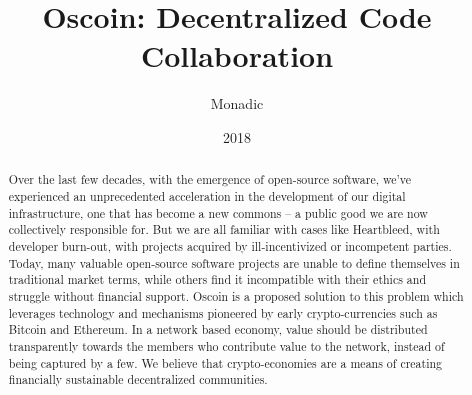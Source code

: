 \documentclass[a4paper, 9pt, draft]{amsart}
\title[Oscoin]{Oscoin: Decentralized Code Collaboration}
\author{Monadic}
\date{2018}
\begin{document}
\begin{abstract}
    Over the last few decades, with the emergence of open-source software,
    we've experienced an unprecedented acceleration in the development of our
    digital infrastructure, one that has become a new commons -- a public good
    we are now collectively responsible for. But we are all familiar with cases
    like Heartbleed, with developer burn-out, with projects acquired by
    ill-incentivized or incompetent parties. Today, many valuable open-source
    software projects are unable to define themselves in traditional market
    terms, while others find it incompatible with their ethics and struggle
    without financial support. Oscoin is a proposed solution to this problem
    which leverages technology and mechanisms pioneered by early
    crypto-currencies such as Bitcoin and Ethereum.  In a network based
    economy, value should be distributed transparently towards the members who
    contribute value to the network, instead of being captured by a few.  We
    believe that crypto-economies are a means of creating financially
    sustainable decentralized communities.
\end{abstract}
\maketitle

\setlength{\columnsep}{20pt}
\begin{multicols}{2}






\end{multicols}

\appendix
\end{document}
